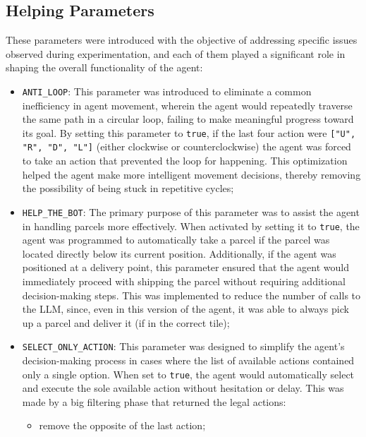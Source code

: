 \subsection{Helping Parameters}
These parameters were introduced with the objective of addressing specific issues
observed during experimentation, and each of them played a significant role in
shaping the overall functionality of the agent:
\begin{itemize}
  \item \texttt{ANTI\_LOOP}: This parameter was introduced to eliminate a common
    inefficiency in agent movement, wherein the agent would repeatedly traverse
    the same path in a circular loop, failing to make meaningful progress toward
    its goal. By setting this parameter to \texttt{true}, if the last four
    action were \texttt{["U", "R", "D", "L"]} (either clockwise or
    counterclockwise) the agent was forced to take an action that prevented the loop
    for happening. This optimization helped the agent make more intelligent
    movement decisions, thereby removing the possibility of being stuck in repetitive
    cycles;

  \item \texttt{HELP\_THE\_BOT}: The primary purpose of this parameter was to assist
    the agent in handling parcels more effectively. When activated by setting it
    to \texttt{true}, the agent was programmed to automatically take a parcel if
    the parcel was located directly below its current position. Additionally, if
    the agent was positioned at a delivery point, this parameter ensured that the
    agent would immediately proceed with shipping the parcel without requiring additional
    decision-making steps. This was implemented to reduce the number of calls to
    the LLM, since, even in this version of the agent, it was able to always pick
    up a parcel and deliver it (if in the correct tile);

  \item \texttt{SELECT\_ONLY\_ACTION}: This parameter was designed to simplify the
    agent's decision-making process in cases where the list of available actions
    contained only a single option. When set to \texttt{true}, the agent would
    automatically select and execute the sole available action without
    hesitation or delay. This was made by a big filtering phase that returned the
    legal actions:
    \begin{itemize}
      \item remove the opposite of the last action;


\end{itemize}
\end{itemize}
